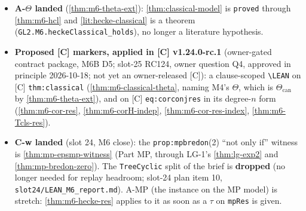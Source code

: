 \begin{remark}\label{rmk:m6-open}
  \begin{itemize}
    \item \textbf{A-$\Theta$ landed} (\ref{thm:m6-theta-ext}): \ref{thm:classical-model} is \texttt{proved} through \ref{thm:m6-hcl}
      and \ref{lit:hecke-classical} is a theorem (\texttt{GL2.M6.heckeClassical\_holds}), no longer a literature hypothesis.
    \item \textbf{Proposed [C] markers, applied in [C] v1.24.0-rc.1} (owner-gated contract package, M6B D5; slot-25 RC124, owner question Q4,
      approved in principle 2026-10-18; not yet an owner-released [C]): a clause-scoped \texttt{\textbackslash LEAN}
      on [C] \texttt{thm:classical} (\ref{thm:m6-classical-theta}, naming M4's $\Theta$, which is $\Theta_{\mathrm{can}}$ by
      \ref{thm:m6-theta-ext}), and on [C] \texttt{eq:corconjres} in its degree-$n$ form (\ref{thm:m6-cor-res},
      \ref{thm:m6-corH-indep}, \ref{thm:m6-cor-res-index}, \ref{thm:m6-Tcls-res}).
    \item \textbf{C-w landed} (slot 24, M6 close): the \texttt{prop:mpbredon}(2) ``not only if'' witness is \ref{thm:mp-epsmp-witness}
      (Part MP, through LG-1's \ref{thm:lg-exp2} and \ref{thm:mp-bredon-zero}). The \texttt{TreeCyclic} split of the brief is
      \textbf{dropped} (no longer needed for replay headroom; slot-24 plan item 10, \texttt{slot24/LEAN\_M6\_report.md}). A-MP (the
      instance on the MP model) is stretch: \ref{thm:m6-hecke-res} applies to it as soon as a $\tau$ on \texttt{mpRes} is given.
  \end{itemize}
\end{remark}
